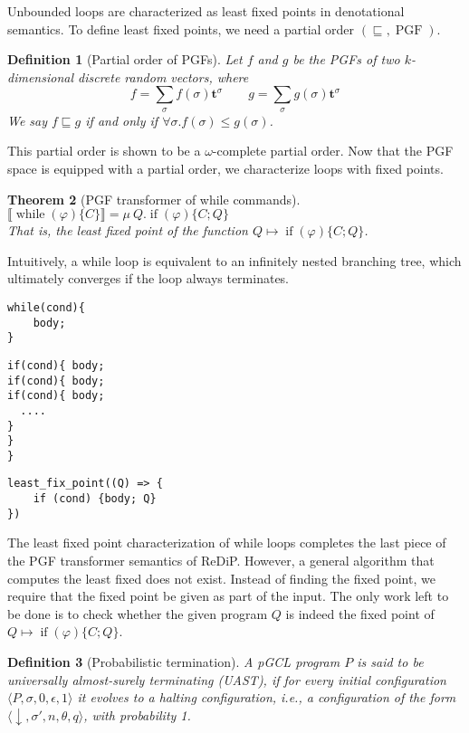 \documentclass[a4paper]{article}
\DeclareMathOperator*{\PGF}{PGF}
\renewcommand{\S}[1]{ \llbracket #1 \rrbracket }
\newtheorem{theorem}{Theorem}[section]
\newtheorem{definition}[theorem]{Definition}
\begin{document}
Unbounded loops are characterized as least fixed points in denotational semantics.
To define least fixed points, we need a partial order \((\sqsubseteq, \PGF)\).
\begin{definition}[Partial order of PGFs]
	Let \(f\) and \(g\) be the PGFs of two \(k\)-dimensional discrete random vectors, where
	\[
		f = \sum_{\sigma} f(\sigma) \mathbf{t}^\sigma
		\qquad
		g = \sum_{\sigma} g(\sigma) \mathbf{t}^\sigma
	\]
	We say \(f \sqsubseteq g\) if and only if \(\forall \sigma . f(\sigma) \leq g(\sigma)\).
\end{definition}
This partial order is shown to be a \(\omega\)-complete partial order\cite{cav-extended}.
Now that the PGF space is equipped with a partial order, we characterize loops with fixed points.
\begin{theorem}[PGF transformer of while commands]
	\(\S{\operatorname{while}(\varphi)\{C\}} = \mu\ Q . \operatorname{if}(\varphi)\{C;Q\}\)\\
	That is, the least fixed point of the function \(Q \mapsto \operatorname{if}(\varphi)\{C;Q\}\).
\end{theorem}
Intuitively, a while loop is equivalent to an infinitely nested branching tree, which ultimately converges if the loop always terminates.
\begin{tcolorbox} \begin{verbatim}
while(cond){
    body;
}\end{verbatim}
\end{tcolorbox}

\begin{tcolorbox} \begin{verbatim}
if(cond){ body;
if(cond){ body;
if(cond){ body;
  ....
}
}
}
\end{verbatim}
\end{tcolorbox}

\begin{tcolorbox} \begin{verbatim}
least_fix_point((Q) => {
    if (cond) {body; Q}
})
\end{verbatim}
\end{tcolorbox}

The least fixed point characterization of while loops completes the last piece of the PGF transformer semantics of ReDiP.
However, a general algorithm that computes the least fixed does not exist.
Instead of finding the fixed point, we require that the fixed point be given as part of the input.
The only work left to be done is to check whether the given program \(Q\) is indeed the fixed point of \(Q\mapsto \operatorname{if}(\varphi)\{C;Q\}\).
\begin{definition}[Probabilistic termination]
	A pGCL program \(P\) is said to be universally almost-surely terminating (UAST),
	if for every initial configuration \(\langle P,\sigma,0,\epsilon,1 \rangle\) it evolves to a halting configuration, i.e., a configuration of the form \(\langle \downarrow, \sigma', n,\theta,q\rangle\), with probability 1.
\end{definition}
\end{document}
